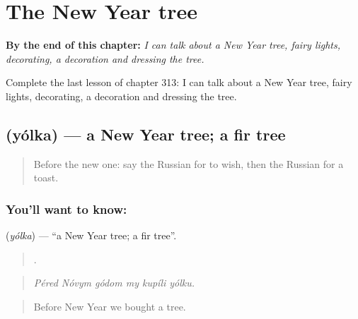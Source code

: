 
\chapter{The New Year tree}
\label{ch:ru-the-new-year-tree}

\begin{chapteropening}
\textbf{By the end of this chapter:} \emph{I can talk about a New Year tree, fairy lights, decorating, a decoration and dressing the tree.}

Complete the last lesson of chapter 313: I can talk about a New Year tree, fairy lights, decorating, a decoration and dressing the tree.
\end{chapteropening}

\section[\texorpdfstring{\ru{ёлка} (yólka)}{ёлка (yólka)}]{ (yólka) — a New Year tree; a fir tree}

\label{lesson:RU-C313-yolka}



\begin{quote}
Before the new one: say the Russian for to wish, then the Russian for a toast.
\end{quote}

\subsection*{You'll want to know: }
\textbf{} (\emph{yólka}) — \textquotedblleft{}a New Year tree; a fir tree\textquotedblright{}.

\begin{quote}
     .
\end{quote}

\begin{quote}
\emph{Péred Nóvym gódom my kupíli yólku.}
\end{quote}

\begin{quote}
Before New Year we bought a tree.
\end{quote}

